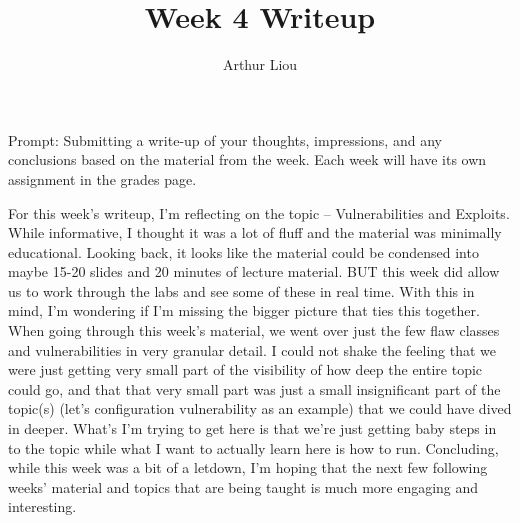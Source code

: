 \documentclass[12pt]{article}
\begin{document}
 
 
\title{Week 4 Writeup}
\author{Arthur Liou}

\maketitle

Prompt: Submitting a write-up of your thoughts, impressions, and any conclusions based on the material from the week. Each week will have its own assignment in the grades page.
\par

\linebreak
	For this week’s writeup, I’m reflecting on the topic – Vulnerabilities and Exploits. While informative, I thought it was a lot of fluff and the material was minimally educational. Looking back, it looks like the material could be condensed into maybe 15-20 slides and 20 minutes of lecture material. BUT this week did allow us to work through the labs and see some of these in real time. With this in mind, I’m wondering if I’m missing the bigger picture that ties this together. When going through this week’s material, we went over just the few flaw classes and vulnerabilities in very granular detail. I could not shake the feeling that we were just getting very small part of the visibility of how deep the entire topic could go, and that that very small part was just a small insignificant part of the topic(s) (let’s configuration vulnerability as an example) that we could have dived in deeper. What’s I’m trying to get here is that we’re just getting baby steps in to the topic while what I want to actually learn here is how to run. Concluding, while this week was a bit of a letdown, I’m hoping that the next few following weeks’ material and topics that are being taught is much more engaging and interesting.
\end{document}
